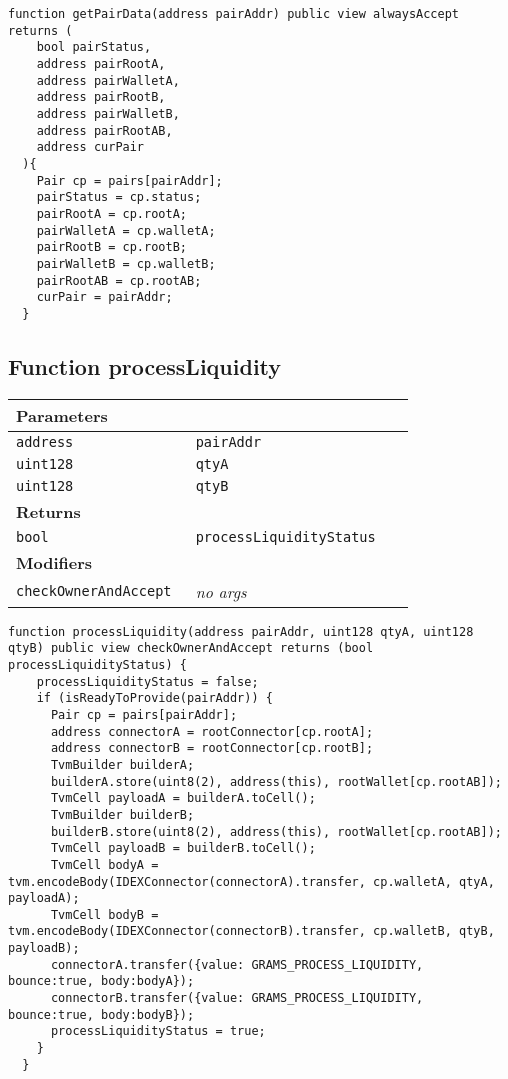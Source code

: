\vspace{2cm}

\begin{lstlisting}[firstnumber=379]
  function getPairData(address pairAddr) public view alwaysAccept returns (
    bool pairStatus,
    address pairRootA,
    address pairWalletA,
    address pairRootB,
    address pairWalletB,
    address pairRootAB,
    address curPair
  ){
    Pair cp = pairs[pairAddr];
    pairStatus = cp.status;
    pairRootA = cp.rootA;
    pairWalletA = cp.walletA;
    pairRootB = cp.rootB;
    pairWalletB = cp.walletB;
    pairRootAB = cp.rootAB;
    curPair = pairAddr;
  }
\end{lstlisting}

\subsection{Function processLiquidity}


\ifsoltables
\noindent\begin{tabular}{|l|l|p{5cm}|}\hline
\multicolumn{3}{|l|}{\bf Parameters}\\\hline
\tt address & \tt pairAddr &\\\hline
\tt uint128 & \tt qtyA &\\\hline
\tt uint128 & \tt qtyB &\\\hline
\multicolumn{3}{|l|}{\bf Returns}\\\hline
\tt bool & \tt processLiquidityStatus &\\\hline
\multicolumn{3}{|l|}{\bf Modifiers}\\\hline
\tt checkOwnerAndAccept & {\em no args} &\\\hline
\end{tabular}
\fi

\vspace{2cm}

\begin{lstlisting}[firstnumber=251]
  function processLiquidity(address pairAddr, uint128 qtyA, uint128 qtyB) public view checkOwnerAndAccept returns (bool processLiquidityStatus) {
    processLiquidityStatus = false;
    if (isReadyToProvide(pairAddr)) {
      Pair cp = pairs[pairAddr];
      address connectorA = rootConnector[cp.rootA];
      address connectorB = rootConnector[cp.rootB];
      TvmBuilder builderA;
      builderA.store(uint8(2), address(this), rootWallet[cp.rootAB]);
      TvmCell payloadA = builderA.toCell();
      TvmBuilder builderB;
      builderB.store(uint8(2), address(this), rootWallet[cp.rootAB]);
      TvmCell payloadB = builderB.toCell();
      TvmCell bodyA = tvm.encodeBody(IDEXConnector(connectorA).transfer, cp.walletA, qtyA, payloadA);
      TvmCell bodyB = tvm.encodeBody(IDEXConnector(connectorB).transfer, cp.walletB, qtyB, payloadB);
      connectorA.transfer({value: GRAMS_PROCESS_LIQUIDITY, bounce:true, body:bodyA});
      connectorB.transfer({value: GRAMS_PROCESS_LIQUIDITY, bounce:true, body:bodyB});
      processLiquidityStatus = true;
    }
  }
\end{lstlisting}

